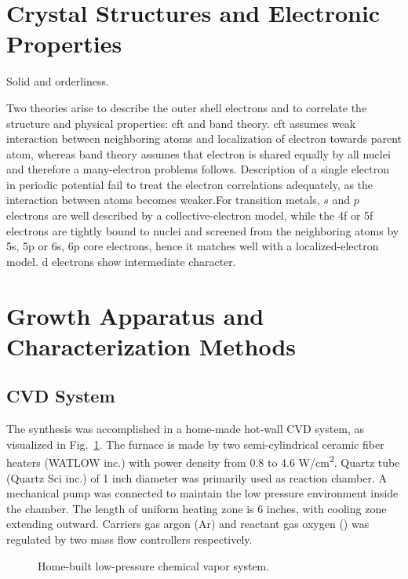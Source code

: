\section{Crystal Structures and Electronic Properties}

Solid and orderliness.




Two theories arise to describe the outer shell electrons and to correlate the structure and physical properties: \gls{cft} and band theory.\cite{Goodenough1971} \gls{cft} assumes weak interaction between neighboring atoms and localization of electron towards parent atom, whereas band theory assumes that electron is shared equally by all nuclei and therefore a many-electron problems follows. Description of a single electron in periodic potential fail to treat the electron correlations adequately, as the interaction between atoms becomes weaker.For transition metals, $s$ and $p$ electrons are well described by a collective-electron model, while the 4f or 5f electrons are tightly bound to nuclei and screened from the neighboring atoms by 5s, 5p or 6s, 6p core electrons, hence it matches well with a localized-electron model. d electrons show intermediate character.

\section{Growth Apparatus and Characterization Methods}
\subsection{CVD System}

The synthesis was accomplished in a home-made hot-wall CVD system, as visualized in Fig.~\ref{fig:ch1cvd}. The furnace is made by two semi-cylindrical ceramic fiber heaters (WATLOW inc.) with power density from 0.8 to 4.6 \si{W/cm^2}. Quartz tube (Quartz Sci inc.) of 1 inch diameter was primarily used as reaction chamber. A mechanical pump was connected to maintain the low pressure environment inside the chamber. The length of uniform heating zone is 6 inches, with cooling zone extending outward. Carriers gas argon (Ar) and reactant gas oxygen () was regulated by two mass flow controllers respectively.

\begin{figure}[htb]
\centering
{}

\caption[CVD system]{Home-built low-pressure chemical vapor system.}
\label{fig:ch1cvd}
\end{figure}

